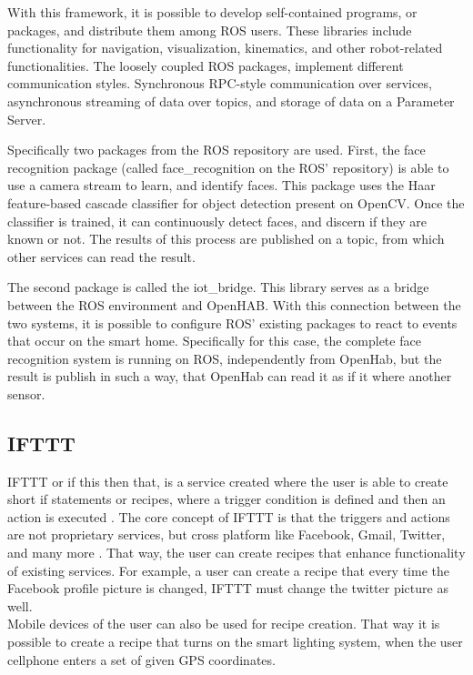 With this framework, it is possible to develop self-contained programs, or packages, and distribute them among ROS users. These libraries include functionality for navigation, visualization, kinematics, and other robot-related functionalities. 
The loosely coupled ROS packages, implement different communication styles. Synchronous RPC-style communication over services, asynchronous streaming of data over topics, and storage of data on a Parameter Server. 

Specifically two packages from the ROS repository are used. First, the face recognition package (called face\_recognition on the ROS' repository) is able to use a camera stream to learn, and identify faces. This package uses the Haar feature-based cascade classifier for object detection present on OpenCV. Once the classifier is trained, it can continuously detect faces, and discern if they are known or not. The results of this process are published on a topic, from which other services can read the result. 

The second package is called the iot\_bridge. This library serves as a bridge between the ROS environment and OpenHAB. With this connection between the two systems, it is possible to configure ROS' existing packages to react to events that occur on the smart home. Specifically for this case, the complete face recognition system is running on ROS, independently from OpenHab, but the result is publish in such a way, that OpenHab can read it as if it where another sensor.

\subsection{IFTTT}
IFTTT or if this then that, is a service created where the user is able to create short if statements or recipes, where a trigger condition is defined and then an action is executed \cite{iffftwtf}. The core concept of IFTTT is that the triggers and actions are not proprietary services, but cross platform like Facebook, Gmail, Twitter, and many more \cite{iffftbegining}. That way, the user can create recipes that enhance functionality of existing services. For example, a user can create a recipe that every time the Facebook profile picture is changed, IFTTT must change the twitter picture as well. \\
Mobile devices of the user can also be used for recipe creation. That way it is possible to create a recipe that turns on the smart lighting system, when the user cellphone enters a set of given GPS coordinates. 

